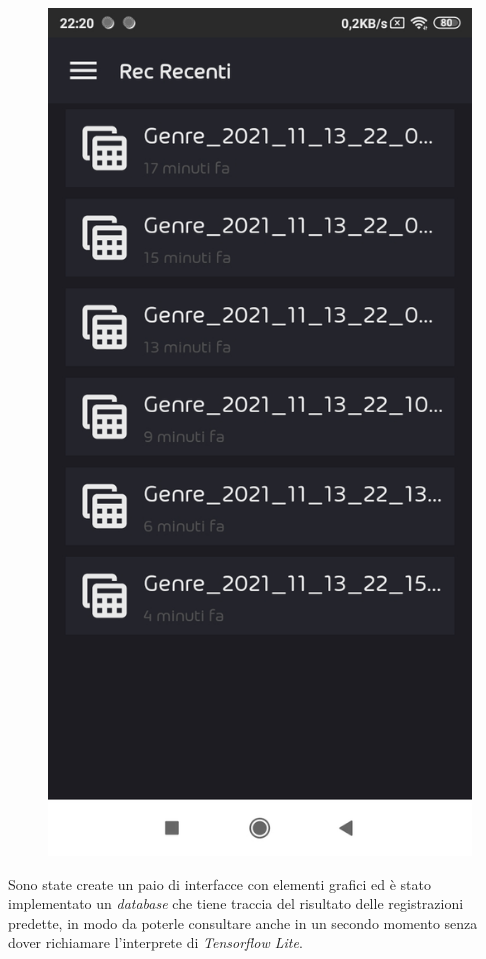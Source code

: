 \begin{figure}[H]
	\includegraphics[scale=0.20]{./images/mobile02.jpg}
\end{figure}
\noindent Sono state create un paio di interfacce con elementi grafici ed è stato implementato un \textit{database} che tiene traccia del risultato delle registrazioni predette, in modo da poterle consultare anche in un secondo momento senza dover richiamare l'interprete di \textit{Tensorflow Lite}.\\
